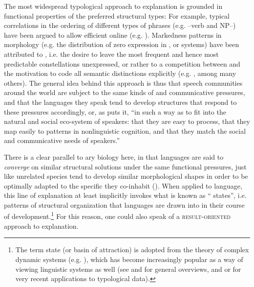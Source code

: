 \documentclass[output=paper]{langsci/langscibook}
\begin{document}
The most widespread typological approach to explanation is grounded in functional properties of the preferred structural types: For example, typical correlations in the ordering of different types of phrases (e.g. –verb and NP–) have been argued to allow efficient online  (e.g. \citealt{Hawkins1994_Perf,Hawkins2004_Eff}). Markedness patterns in morphology (e.g. the distribution of zero expression in ,  or  systems) have been attributed to , i.e. the desire to leave the most frequent and hence most predictable constellations unexpressed, or rather to a competition between  and the motivation to code all semantic distinctions explicitly (e.g. \citealt{Haiman1983,Comrie1989,Aissen2003,Croft2003,Haspelmath2008_Econ}, among many others). The general idea behind this approach is thus that speech communities around the world are subject to the same kinds of  and communicative pressures, and that the languages they speak tend to develop structures that respond to these pressures accordingly, or, as \citet[118]{Bickel2014} puts it, “in such a way as to fit into the natural and social eco-system of speakers: that they are easy to process, that they map easily to patterns in nonlinguistic cognition, and that they match the social and communicative needs of speakers.” 

There is a clear parallel to ary biology here, in that languages are said to \textit{converge} on similar structural solutions under the same functional pressures, just like unrelated species tend to develop similar morphological shapes in order to be optimally adapted to the specific  they co-inhabit (\citealt{Deacon1997,Caldwell2008,EvansLevinson2009,Givón2010}). When applied to language, this line of explanation at least implicitly invokes what is known as “ states”, i.e. patterns of structural organization that languages are drawn into in their course of development.\footnote{The term  state (or basin of attraction) is adopted from the theory of complex dynamic systems (e.g.  \citealt{Cooper1999,HoweLewis2005,Holland2006}), which has become increasingly popular as a way of viewing linguistic systems as well (see \citealt{BecknerEtAl2009} and \citealt{Port2009} for general overviews, and \citealt{Haig2018} or \citealt{Nichols2018} for very recent applications to typological data).} For this reason, one could also speak of a \textsc{result-oriented} approach to explanation. 
\end{document}

